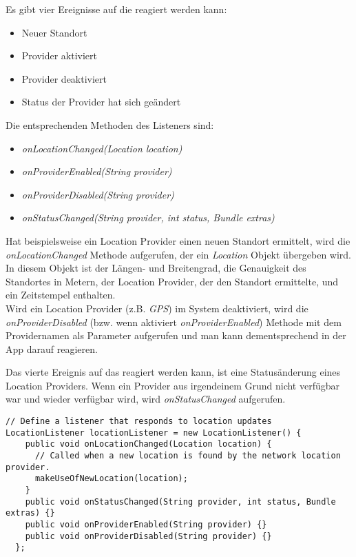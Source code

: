 Es gibt vier Ereignisse auf die reagiert werden kann:
\begin{itemize}
     \item Neuer Standort
     \item Provider aktiviert
     \item Provider deaktiviert
     \item Status der Provider hat sich geändert
\end{itemize}
Die entsprechenden Methoden des Listeners sind:
\begin{itemize}
     \item \textit{onLocationChanged(Location location)}
     \item \textit{onProviderEnabled(String provider)}
     \item \textit{onProviderDisabled(String provider)}
     \item \textit{onStatusChanged(String provider, int status, Bundle extras)}
\end{itemize}
Hat beispielsweise ein Location Provider einen neuen Standort ermittelt, wird die \textit{onLocationChanged} Methode aufgerufen, der ein \textit{Location} Objekt übergeben wird. In diesem Objekt ist der Längen- und Breitengrad, die Genauigkeit des Standortes in Metern, der Location Provider, der den Standort ermittelte, und ein Zeitstempel enthalten. 
\\
Wird ein Location Provider (z.B. \textit{GPS}) im System deaktiviert, wird die \textit{onProviderDisabled} (bzw. wenn aktiviert \textit{onProviderEnabled}) Methode mit dem Providernamen als Parameter aufgerufen und man kann dementsprechend in der App darauf reagieren. 

\newpage
Das vierte Ereignis auf das reagiert werden kann, ist eine Statusänderung eines Location Providers. Wenn ein Provider aus irgendeinem Grund nicht verfügbar war und wieder verfügbar wird, wird \textit{onStatusChanged} aufgerufen.

\begin{lstlisting}[caption={LocationListener},label=lst:locationListener]
// Define a listener that responds to location updates
LocationListener locationListener = new LocationListener() {
    public void onLocationChanged(Location location) {
      // Called when a new location is found by the network location provider.
      makeUseOfNewLocation(location);
    }
    public void onStatusChanged(String provider, int status, Bundle extras) {}
    public void onProviderEnabled(String provider) {}
    public void onProviderDisabled(String provider) {}
  };
\end{lstlisting}

